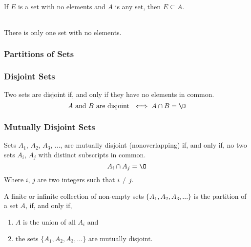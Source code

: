 \documentclass[11pt]{article}
\newcommand\bl{\ \\}
\begin{document}
\begin{theorem}\label{thm:empty-set}\bl
    If $E$ is a set with no elements and $A$ is any set, then $E \subseteq A$.
\end{theorem}

\begin{corollary}\label{cor:empty-set-unique}\bl
    There is only one set with no elements.
\end{corollary}

\subsubsection{Partitions of Sets}

\subsubsection{Disjoint Sets}
\begin{definition}[Disjoint]\label{def:disjoint}
    Two sets are disjoint if, and only if they have no elements in common.
    \begin{equation*}
        \text{$A$ and $B$ are disjoint } \iff A \cap B = \O
    \end{equation*}
\end{definition}


\subsubsection{Mutually Disjoint Sets}
\begin{definition}\label{def:mutually-disjoint}
    Sets $A_1$, $A_2$, $A_3$, ..., are mutually disjoint (nonoverlapping)
    if, and only if, no two sets $A_i$, $A_j$ with distinct subscripts
    in common.
    \begin{equation*}
        A_i \cap A_j = \O
    \end{equation*}
    Where $i$, $j$ are two integers such that $i \neq j$.
\end{definition}

\begin{definition}[Partition]\label{def:partition}
    A finite or infinite collection of non-empty sets $\{ A_1, A_2, A_3, ... \}$
    is the partition of a set $A$, if, and only if,
    \begin{enumerate}
        \item $A$ is the union of all $A_i$ and
        \item the sets $\{ A_1, A_2, A_3, ... \}$ are mutually disjoint.
    \end{enumerate}
\end{definition}
\end{document}
